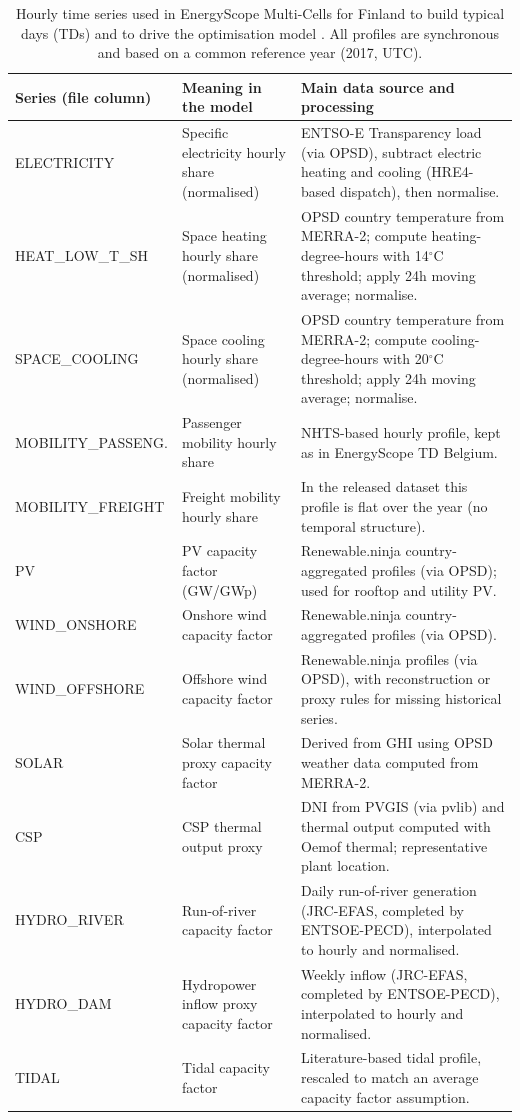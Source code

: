 \documentclass{article}
\begin{document}
\begin{table}[t]
\centering
\footnotesize
\caption{Hourly time series used in EnergyScope Multi-Cells for Finland to build typical days (TDs) and to drive the optimisation model \citep{thiran_exploring_2025}. All profiles are synchronous and based on a common reference year (2017, UTC).}
\label{tab:fi_td_inputs_sources}
\begin{tabular}{p{3.1cm}p{5.6cm}p{5.4cm}}
\toprule
\textbf{Series (file column)} & \textbf{Meaning in the model} & \textbf{Main data source and processing} \\
\midrule
ELECTRICITY & Specific electricity hourly share (normalised) & ENTSO-E Transparency load (via OPSD), subtract electric heating and cooling (HRE4-based dispatch), then normalise. \\
HEAT\_LOW\_T\_SH & Space heating hourly share (normalised) & OPSD country temperature from MERRA-2; compute heating-degree-hours with 14$^\circ$C threshold; apply 24h moving average; normalise. \\
SPACE\_COOLING & Space cooling hourly share (normalised) & OPSD country temperature from MERRA-2; compute cooling-degree-hours with 20$^\circ$C threshold; apply 24h moving average; normalise. \\
MOBILITY\_PASSENG. & Passenger mobility hourly share & NHTS-based hourly profile, kept as in EnergyScope TD Belgium. \\
MOBILITY\_FREIGHT & Freight mobility hourly share & In the released dataset this profile is flat over the year (no temporal structure). \\
\midrule
PV & PV capacity factor (GW/GWp) & Renewable.ninja country-aggregated profiles (via OPSD); used for rooftop and utility PV. \\
WIND\_ONSHORE & Onshore wind capacity factor & Renewable.ninja country-aggregated profiles (via OPSD). \\
WIND\_OFFSHORE & Offshore wind capacity factor & Renewable.ninja profiles (via OPSD), with reconstruction or proxy rules for missing historical series. \\
SOLAR & Solar thermal proxy capacity factor & Derived from GHI using OPSD weather data computed from MERRA-2. \\
CSP & CSP thermal output proxy & DNI from PVGIS (via pvlib) and thermal output computed with Oemof thermal; representative plant location. \\
HYDRO\_RIVER & Run-of-river capacity factor & Daily run-of-river generation (JRC-EFAS, completed by ENTSOE-PECD), interpolated to hourly and normalised. \\
HYDRO\_DAM & Hydropower inflow proxy capacity factor & Weekly inflow (JRC-EFAS, completed by ENTSOE-PECD), interpolated to hourly and normalised. \\
TIDAL & Tidal capacity factor & Literature-based tidal profile, rescaled to match an average capacity factor assumption. \\
\bottomrule
\end{tabular}
\end{table}
\end{document}
